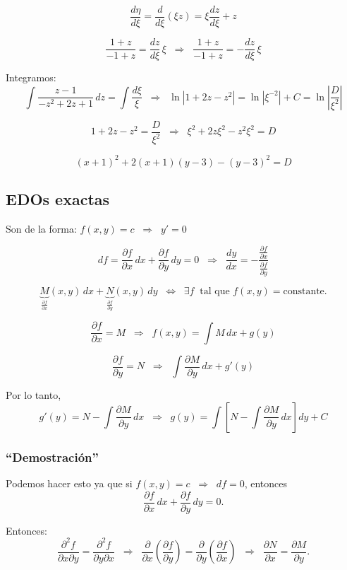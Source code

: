 \documentclass[a4paper,12pt]{article}
\begin{document}
\[
\frac{d\eta}{d\xi} = \frac{d}{d\xi}(\xi z) = \xi \frac{dz}{d\xi} + z
\]

\[
\frac{1+z}{-1+z} = \frac{dz}{d\xi}\,\xi
\;\;\Rightarrow\;\;
\frac{1+z}{-1+z} = -\frac{dz}{d\xi}\,\xi
\]

Integramos:
\[
\int \frac{z-1}{-z^2+2z+1}\,dz = \int \frac{d\xi}{\xi}
\;\;\Rightarrow\;\;
\ln|1+2z-z^2| = \ln|\xi^{-2}| + C = \ln\left|\frac{D}{\xi^2}\right|
\]

\[
1+2z-z^2 = \frac{D}{\xi^2}
\;\;\Rightarrow\;\;
\xi^2 + 2z\xi^2 - z^2\xi^2 = D
\]

\[
(x+1)^2 + 2(x+1)(y-3) - (y-3)^2 = D
\]

\subsection{EDOs exactas}

Son de la forma: $f(x,y)=c \;\;\Rightarrow\;\; y'=0$

\[
df = \frac{\partial f}{\partial x}\,dx + \frac{\partial f}{\partial y}\,dy = 0
\;\;\Rightarrow\;\;
\frac{dy}{dx} = -\frac{\frac{\partial f}{\partial x}}{\frac{\partial f}{\partial y}}
\]

\[
\underbrace{M}_{\frac{\partial f}{\partial x}}(x,y)\,dx + 
\underbrace{N}_{\frac{\partial f}{\partial y}}(x,y)\,dy
\;\;\Leftrightarrow\;\; 
\exists f \;\; \text{tal que } f(x,y)=\text{constante}.
\]

\[
\frac{\partial f}{\partial x}=M \;\;\Rightarrow\;\; 
f(x,y) = \int M\,dx + g(y)
\]

\[
\frac{\partial f}{\partial y}=N \;\;\Rightarrow\;\;
\int \frac{\partial M}{\partial y}\,dx + g'(y)
\]

Por lo tanto,
\[
g'(y) = N - \int \frac{\partial M}{\partial y}\,dx 
\;\;\Rightarrow\;\;
g(y) = \int\left[N - \int \frac{\partial M}{\partial y}\,dx\right]dy + C
\]

\subsubsection*{“Demostración”}

Podemos hacer esto ya que si $f(x,y)=c \;\;\Rightarrow\;\; df=0$,  
entonces
\[
\frac{\partial f}{\partial x}\,dx + \frac{\partial f}{\partial y}\,dy = 0.
\]

Entonces:
\[
\frac{\partial^2 f}{\partial x \partial y} = \frac{\partial^2 f}{\partial y \partial x}
\;\;\Rightarrow\;\;
\frac{\partial}{\partial x}\!\left(\frac{\partial f}{\partial y}\right)
= \frac{\partial}{\partial y}\!\left(\frac{\partial f}{\partial x}\right)
\;\;\Rightarrow\;\;
\frac{\partial N}{\partial x} = \frac{\partial M}{\partial y}.
\]
\end{document}
